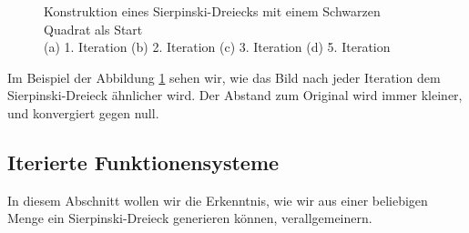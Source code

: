 \begin{figure}	
	\centering
	\caption{Konstruktion eines Sierpinski-Dreiecks mit einem Schwarzen Quadrat als Start\\
		(a) 1. Iteration (b) 2. Iteration (c) 3. Iteration (d) 5. Iteration}
	\label{ifs:sierpconst}
\end{figure}
Im Beispiel der Abbildung \ref{ifs:sierpconst} sehen wir, wie das Bild nach jeder Iteration dem Sierpinski-Dreieck ähnlicher wird.
Der Abstand zum Original wird immer kleiner, und konvergiert gegen null.

\subsection{Iterierte Funktionensysteme
\label{ifs:subsection:bonorum}}
In diesem Abschnitt wollen wir die Erkenntnis, wie wir aus einer beliebigen Menge ein Sierpinski-Dreieck generieren können, verallgemeinern.


